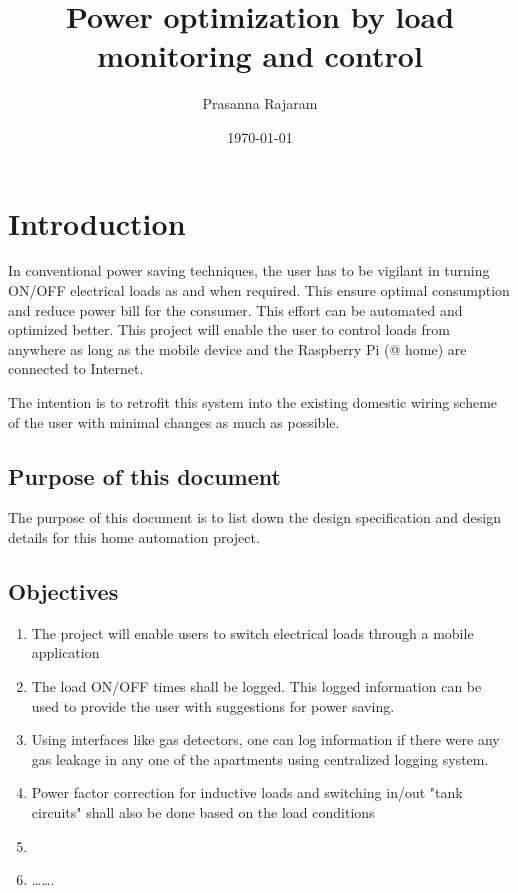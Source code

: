 \documentclass[a4paper,11pt,titlepage]{article}
\author{Prasanna Rajaram}
\date{\today}
\title{Power optimization by load monitoring and control}
\begin{document}
\maketitle
\tableofcontents

\section{Introduction}
\label{sec:orgfb07e53}
In conventional power saving techniques, the user has to be vigilant
in turning ON/OFF electrical loads as and when required. This ensure
optimal consumption and reduce power bill for the consumer. This
effort can be automated and optimized better. This project will enable
the user to control loads from anywhere as long as the mobile device
and the Raspberry Pi (@ home) are connected to Internet.  

The intention is to retrofit this system into the existing domestic
wiring scheme of the user with minimal changes as much as possible.

\subsection{Purpose of this document}
\label{sec:org22e2998}
The purpose of this document is to list down the design specification
and design details for this home automation project. 

\subsection{Objectives}
\label{sec:org2c52611}
\begin{enumerate}
\item The project will enable users to switch electrical loads through a
mobile application
\item The load ON/OFF times shall be logged. This logged information can
be used to provide the user with suggestions for power saving.
\item Using interfaces like gas detectors, one can log information if
there were any gas leakage in any one of the apartments using
centralized logging system.
\item Power factor correction for inductive loads and switching in/out
"tank circuits" shall also be done based on the load conditions
\item 

\item \ldots{}\ldots{}.
\end{enumerate}
\end{document}
